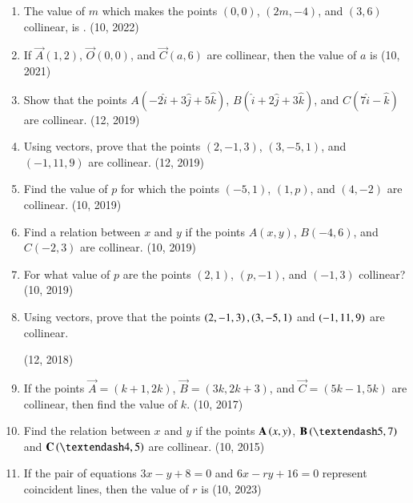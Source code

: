 \begin{enumerate}[label=\thesubsection.\arabic*, ref=\thesubsection.\theenumi]
    \item The value of $m$ which makes the points $(0,0)$, $(2m, -4)$, and $(3,6)$ collinear, is \underline{\hspace{1cm}}.
    \hfill (10, 2022)
		\item If $\vec{A}(1, 2)$, $\vec{O}(0, 0)$, and $\vec{C}(a, 6)$ are collinear, then the value of $a$ is
		\hfill (10, 2021)
	\item Show that the points $A(-2\hat{i} + 3\hat{j} + 5\hat{k})$, $B(\hat{i} + 2\hat{j} + 3\hat{k})$, and $C(7\hat{i} - \hat{k})$ are collinear. \hfill (12, 2019)
	\item Using vectors, prove that the points $(2, -1, 3)$, $(3, -5, 1)$, and $(-1, 11, 9)$ are collinear. \hfill (12, 2019)
\item Find the value of $p$ for which the points $(-5, 1)$, $(1, p)$, and $(4, -2)$ are collinear. \hfill (10, 2019)
\item Find a relation between $x$ and $y$ if the points $A(x, y)$, $B(-4, 6)$, and $C(-2, 3)$ are collinear. \hfill (10, 2019)
\item For what value of $p$ are the points $(2, 1)$, $(p, -1)$, and $(-1, 3)$ collinear? \hfill (10, 2019)
\item Using vectors, prove that the points $\left(2,-1,3\right),\left(3,-5,1\right)$ and $\left(-1,11,9\right)$ are collinear.

\hfill (12, 2018) 
\item If the points $\vec{A} = (k+1, 2k)$, $\vec{B} = (3k, 2k + 3)$, and $\vec{C} = (5k-1, 5k)$ are collinear, then find the value of $k$. \hfill (10, 2017)
\item Find the relation between $x$ and $y$ if the points $\mathbf{A}\left(x,y\right)$, $\vec{B}\brak{–5,7}$ and $\vec{C}\brak{–4, 5}$ are collinear. \hfill (10, 2015)
  \item If the pair of equations $3x-y+8=0$ and $6x-ry+16=0$ represent coincident lines, then the value of $r$ is
     \hfill (10, 2023)
\end{enumerate}
